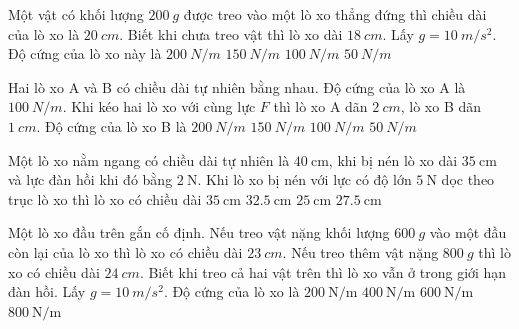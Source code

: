 \begin{ex}
	Một vật có khối lượng $\SI{200}{g}$ được treo vào một lò xo thẳng đứng thì chiều dài của lò xo là $\SI{20}{cm}$. Biết khi chưa treo vật thì lò xo dài $\SI{18}{cm}$. Lấy $g=\SI{10}{m/s^2}$. Độ cứng của lò xo này là
	\choice
	{$\SI{200}{N/m}$}
	{$\SI{150}{N/m}$}
	{\True $\SI{100}{N/m}$}
	{$\SI{50}{N/m}$}
\end{ex}
		
\begin{ex}
		Hai lò xo A và B có chiều dài tự nhiên bằng nhau. Độ cứng của lò xo A là $\SI{100}{N/m}$. Khi kéo hai lò xo với cùng lực $F$ thì lò xo A dãn $\SI{2}{cm}$, lò xo B dãn $\SI{1}{cm}$. Độ cứng của lò xo B là
	\choice
	{\True $\SI{200}{N/m}$}
	{$\SI{150}{N/m}$}
	{$\SI{100}{N/m}$}
	{$\SI{50}{N/m}$}
\end{ex}
	\begin{ex}
		Một lò xo nằm ngang có chiều dài tự nhiên là $\SI{40}{\centi\meter}$, khi bị nén lò xo dài $\SI{35}{\centi\meter}$ và lực đàn hồi khi đó bằng $\SI{2}{\newton}$. Khi lò xo bị nén với lực có độ lớn $\SI{5}{\newton}$ dọc theo trục lò xo thì lò xo có chiều dài
		\choice
		{$\SI{35}{\centi\meter}$}
		{$\SI{32.5}{\centi\meter}$}
		{$\SI{25}{\centi\meter}$}
		{\True $\SI{27.5}{\centi\meter}$}
	\end{ex}
\begin{ex}
Một lò xo đầu trên gắn cố định. Nếu treo vật nặng khối lượng $\SI{600}{g}$ vào một đầu còn lại của lò xo thì lò xo có chiều dài $\SI{23}{cm}$. Nếu treo thêm vật nặng $\SI{800}{g}$ thì lò xo có chiều dài $\SI{24}{cm}$. Biết khi treo cả hai vật trên thì lò xo vẫn ở trong giới hạn đàn hồi. Lấy $g=\SI{10}{m/s^2}$. Độ cứng của lò xo là	
	\choice
	{$\SI{200}{\newton/\meter}$}
	{$\SI{400}{\newton/\meter}$}
	{$\SI{600}{\newton/\meter}$}
	{\True $\SI{800}{\newton/\meter}$}
\end{ex}
